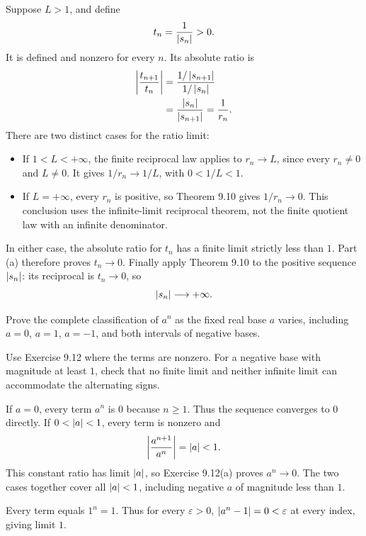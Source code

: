 Suppose $L>1$, and define
\[
 t_n=\frac1{\left|s_n\right|}>0.
\]
It is defined and nonzero for every $n$. Its absolute ratio is
\begin{align*}
 \left|\frac{t_{n+1}}{t_n}\right|
 &=\frac{1/\left|s_{n+1}\right|}{1/\left|s_n\right|}\\
 &=\frac{\left|s_n\right|}{\left|s_{n+1}\right|}
 =\frac1{r_n}.
\end{align*}
There are two distinct cases for the ratio limit:
\begin{itemize}
 \item If $1<L<+\infty$, the finite reciprocal law applies
       to $r_n\to L$, since every $r_n\ne0$ and $L\ne0$.
       It gives $1/r_n\to1/L$, with $0<1/L<1$.
 \item If $L=+\infty$, every $r_n$ is positive, so
       Theorem 9.10 gives $1/r_n\to0$. This conclusion uses
       the infinite-limit reciprocal theorem, not the finite
       quotient law with an infinite denominator.
\end{itemize}
In either case, the absolute ratio for $t_n$ has a finite limit
strictly less than $1$. Part (a) therefore proves $t_n\to0$.
Finally apply Theorem 9.10 to the positive sequence
$\left|s_n\right|$: its reciprocal is $t_n\to0$, so
\[
 \left|s_n\right|\longrightarrow+\infty.
\]



\goal Prove the complete classification of $a^n$ as the fixed
real base $a$ varies, including $a=0$, $a=1$, $a=-1$, and
both intervals of negative bases.

\idea Use Exercise 9.12 where the terms are nonzero. For a
negative base with magnitude at least $1$, check that no finite
limit and neither infinite limit can accommodate the alternating
signs.

If $a=0$, every term $a^n$ is $0$ because $n\geq1$.
Thus the sequence converges to $0$ directly.
If $0<\left|a\right|<1$, every term is nonzero and
\[
 \left|\frac{a^{n+1}}{a^n}\right|=\left|a\right|<1.
\]
This constant ratio has limit $\left|a\right|$, so Exercise 9.12(a)
proves $a^n\to0$. The two cases together cover all
$\left|a\right|<1$, including negative $a$ of magnitude less than $1$.

Every term equals $1^n=1$. Thus for every $\varepsilon>0$,
$\left|a^n-1\right|=0<\varepsilon$ at every index, giving limit $1$.

